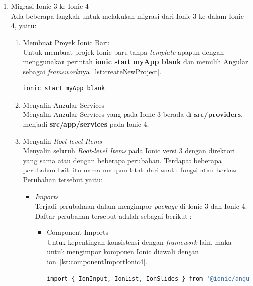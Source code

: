\begin{enumerate}
	\item Migrasi Ionic 3 ke Ionic 4 \\
	Ada beberapa langkah untuk melakukan migrasi dari Ionic 3 ke dalam Ionic 4, yaitu:
	

	\begin{enumerate}
		\item Membuat Proyek Ionic Baru \\
		Untuk membuat projek Ionic baru tanpa {\it template} apapun dengan menggunakan perintah \textbf{ionic start myApp blank} dan memilih Angular sebagai {\it framework}nya~\ref{lst:createNewProject}.
		\begin{lstlisting}[language=php, label={lst:createNewProject}, caption=Perintah Membuat Proyek Ionic Baru]
			ionic start myApp blank
		\end{lstlisting}

		\item Menyalin Angular Services \\
		Menyalin Angular Services yang pada Ionic 3 berada di \textbf{src/providers}, menjadi \textbf{src/app/services} pada Ionic 4.

		\item Menyalin {\it Root-level Items} \\
		Menyalin seluruh {\it Root-level Items} pada Ionic versi 3 dengan direktori yang sama atau dengan beberapa perubahan. Terdapat beberapa perubahan baik itu nama maupun letak dari suatu fungsi atau berkas. Perubahan tersebut yaitu:

		\begin{itemize}



			\item {\it Imports} \\
			Terjadi perubahaan dalam mengimpor {\it package} di Ionic 3 dan Ionic 4. Daftar perubahan tersebut adalah sebagai berikut :
			\begin{itemize}	
				\item Component Imports \\
				Untuk kepentingan konsistensi dengan {\it framework} lain, maka untuk mengimpor komponen Ionic diawali dengan ion~\ref{lst:componentImportIonic4}.
				\begin{lstlisting}[language=php, label={lst:componentImportIonic4}, caption=Impor Komponen pada Ionic 4]
					import { IonInput, IonList, IonSlides } from '@ionic/angular';
				\end{lstlisting}


\end{itemize}
\end{itemize}
\end{enumerate}
\end{enumerate}
